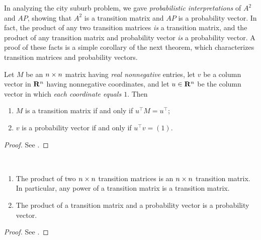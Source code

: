 \begin{remark} \label{remark 5.3.4}
In analyzing the city suburb problem, we gave \emph{probabilistic interpretations} of \(A^2\) and \(AP\), showing that \(A^2\) is a transition matrix and \(AP\) is a probability vector.
In fact, the product of any two transition matrices \emph{is} a transition matrix, and the product of any transition matrix and probability vector \emph{is} a probability vector.
A proof of these facts is a simple corollary of the next theorem, which characterizes transition matrices and probability
vectors.
\end{remark}

\begin{theorem} \label{thm 5.14}
Let \(M\) be an \(n \times n\) matrix having \emph{real nonnegative} entries, let \(v\) be a column vector in \(\mathbf{R}^n\) having nonnegative coordinates, and let \(u \in \mathbf{R}^n\) be the column vector in which \emph{each coordinate equals \(1\)}.
Then
\begin{enumerate}
\item \(M\) is a transition matrix if and only if \(u^\top M = u^\top\);
\item \(v\) is a probability vector if and only if \(u^\top v = (1)\).
\end{enumerate}
\end{theorem}

\begin{proof}
See .
\end{proof}

\begin{corollary} \label{corollary 5.14.1} \ 

\begin{enumerate}
\item The product of two \(n \times n\) transition matrices is an \(n \times n\) transition matrix.
In particular, any power of a transition matrix is a transition matrix.

\item The product of a transition matrix and a probability vector is a probability vector.
\end{enumerate}
\end{corollary}

\begin{proof}
See .
\end{proof}

